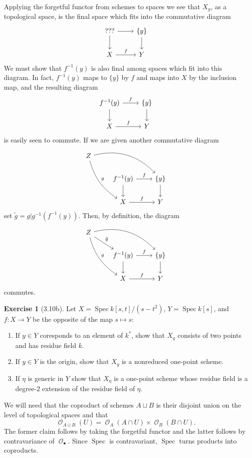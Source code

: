 \documentclass[10pt]{article}
\newcommand{\Spec}{\operatorname{Spec}}
\DeclareMathOperator{\Olo}{\mathscr O}
\theoremstyle{definition}
\newtheorem{exer}{Exercise}
\begin{document}
Applying the forgetful functor from schemes to spaces we see that $X_y$, as a topological space, is the final space which fits into the commutative diagram
$$\begin{tikzcd}??? \arrow[r] \arrow[d] & \{y\} \arrow[d] \\
X \arrow[r,"f"] & Y\end{tikzcd}$$
We must show that $f^{-1}(y)$ is also final among spaces which fit into this diagram. In fact, $f^{-1}(y)$ maps to $\{y\}$ by $f$ and maps into $X$ by the inclusion map, and the resulting diagram
$$\begin{tikzcd}f^{-1}(y) \arrow[r,"f"] \arrow[d] & \{y\} \arrow[d] \\
X \arrow[r,"f"] & Y\end{tikzcd}$$
is easily seen to commute.
If we are given another commutative diagram
$$\begin{tikzcd} Z \arrow[drr,bend left=30] \arrow[ddr,bend right=20,"g"] \\
& f^{-1}(y) \arrow[r,"f"] \arrow[d] & \{y\} \arrow[d] \\
& X \arrow[r,"f"] & Y\end{tikzcd}$$
set $\tilde g = g|g^{-1}(f^{-1}(y))$. Then, by definition, the diagram
$$\begin{tikzcd} Z \arrow[drr,bend left=30] \arrow[ddr,bend right=20,"g"] \arrow[dr,"\tilde g"] \\
& f^{-1}(y) \arrow[r,"f"] \arrow[d] & \{y\} \arrow[d] \\
& X \arrow[r,"f"] & Y\end{tikzcd}$$
commutes.

\begin{exer}[3.10b]
Let $X = \Spec k[s, t]/(s - t^2)$, $Y = \Spec k[s]$, and $f: X \to Y$ be the opposite of the map $s \mapsto s$:
\begin{enumerate}
\item If $y \in Y$ coresponds to an element of $k^*$, show that $X_y$ consists of two points and has residue field $k$.
\item If $y \in Y$ is the origin, show that $X_y$ is a nonreduced one-point scheme.
\item If $\eta$ is generic in $Y$ show that $X_\eta$ is a one-point scheme whose residue field is a degree-$2$ extension of the residue field of $\eta$.
\end{enumerate}
\end{exer}

We will need that the coproduct of schemes $A \sqcup B$ is their disjoint union on the level of topological spaces and that
$$\Olo_{A \sqcup B}(U) = \Olo_A(A \cap U) \times \Olo_B(B \cap U).$$
The former claim follows by taking the forgetful functor and the latter follows by contravariance of $\Olo_\bullet$.
Since $\Spec$ is contravariant, $\Spec$ turns products into coproducts.
\end{document}
